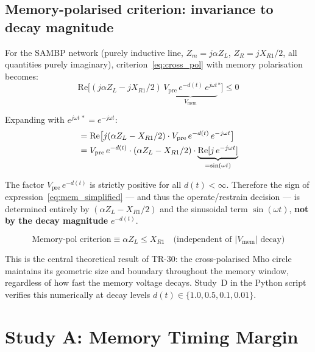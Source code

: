 \documentclass[11pt,a4paper]{article}
\begin{document}
\subsection{Memory-polarised criterion: invariance to decay magnitude}
\label{sec:mem_invariance}

For the SAMBP network (purely inductive line, $Z_m = j\alpha Z_L$, $Z_R =
jX_{R1}/2$, all quantities purely imaginary), criterion~\eqref{eq:cross_pol} with
memory polarisation becomes:
\begin{equation}
  \mathrm{Re}\bigl[(j\alpha Z_L - jX_{R1}/2)\,
    \underbrace{V_\mathrm{pre}\,e^{-d(t)}\,e^{j\omega t}}_{V_\mathrm{mem}}{}^*\bigr] \leq 0
  \label{eq:mem_expanded}
\end{equation}

Expanding with $e^{j\omega t\,*} = e^{-j\omega t}$:
\begin{align}
  &= \mathrm{Re}\bigl[j(\alpha Z_L - X_{R1}/2)\cdot V_\mathrm{pre}\,
     e^{-d(t)}\,e^{-j\omega t}\bigr] \notag\\
  &= V_\mathrm{pre}\,e^{-d(t)}\cdot(\alpha Z_L - X_{R1}/2)\cdot
     \underbrace{\mathrm{Re}[j\,e^{-j\omega t}]}_{=\sin(\omega t)}
  \label{eq:mem_simplified}
\end{align}

The factor $V_\mathrm{pre}\,e^{-d(t)}$ is strictly positive for all $d(t)<\infty$.
Therefore the sign of expression~\eqref{eq:mem_simplified} --- and thus the
operate/restrain decision --- is determined entirely by $(\alpha Z_L - X_{R1}/2)$
and the sinusoidal term $\sin(\omega t)$, \textbf{not by the decay magnitude}
$e^{-d(t)}$.

\begin{equation}
  \boxed{
    \text{Memory-pol criterion} \equiv \alpha Z_L \leq X_{R1}
    \quad\text{(independent of }|V_\mathrm{mem}|\text{ decay)}
  }
  \label{eq:mem_invariant}
\end{equation}

This is the central theoretical result of TR-30: the cross-polarised Mho circle
maintains its geometric size and boundary throughout the memory window, regardless
of how fast the memory voltage decays.  Study~D in the Python script verifies this
numerically at decay levels $d(t) \in \{1.0, 0.5, 0.1, 0.01\}$.

\section{Study A: Memory Timing Margin}
\label{sec:timing}
\end{document}

